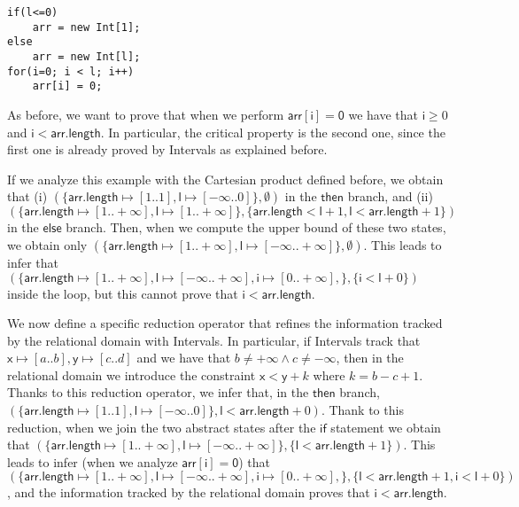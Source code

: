 \documentclass[submission,copyright,creativecommons]{eptcs}
\newcommand{\statement}[1]{\ensuremath{\mathsf{#1}}}
\begin{document}
\begin{lstlisting}
if(l<=0)
	arr = new Int[1];
else 
	arr = new Int[l];
for(i=0; i < l; i++)
	arr[i] = 0;
\end{lstlisting}

As before, we want to prove that when we perform \statement{arr[i]=0} we have that $\statement{i} \geq 0$ and $\statement{i} < \statement{arr.length}$. In particular, the critical property is the second one, since the first one is already proved by Intervals as explained before.

If we analyze this example with the Cartesian product defined before, we obtain that (i) $(\{\statement{arr.length} \mapsto [1..1], \statement{l} \mapsto [-\infty..0]\}, \emptyset)$ in the \statement{then} branch, and (ii) $(\{\statement{arr.length} \mapsto [1..+\infty], \statement{l} \mapsto [1..+\infty]\}, \{\statement{arr.length} < \statement{l}+1, \statement{l} < \statement{arr.length}+1\})$ in the \statement{else} branch. Then, when we compute the upper bound of these two states, we obtain only $(\{\statement{arr.length} \mapsto [1..+\infty], \statement{l} \mapsto [-\infty..+\infty]\}, \emptyset)$. This leads to infer that $(\{\statement{arr.length} \mapsto [1..+\infty], \statement{l} \mapsto [-\infty..+\infty], \statement{i} \mapsto [0..+\infty], \}, \{\statement{i} < \statement{l}+0\})$ inside the loop, but this cannot prove that $\statement{i} < \statement{arr.length}$.

We now define a specific reduction operator that refines the information tracked by the relational domain with Intervals. In particular, if Intervals track that $\statement{x} \mapsto [a..b], \statement{y} \mapsto [c..d]$ and we have that $b \neq +\infty \wedge c \neq -\infty$, then in the relational domain we introduce the constraint $\statement{x} < \statement{y} + k$ where $k=b-c+1$. Thanks to this reduction operator, we infer that, in the \statement{then} branch, $(\{\statement{arr.length} \mapsto [1..1], \statement{l} \mapsto [-\infty..0]\}, \statement{l} < \statement{arr.length} + 0)$. Thank to this reduction, when we join the two abstract states after the \statement{if} statement we obtain that $(\{\statement{arr.length} \mapsto [1..+\infty], \statement{l} \mapsto [-\infty..+\infty]\}, \{\statement{l} < \statement{arr.length} + 1\})$. This leads to infer (when we analyze \statement{arr[i]=0}) that $(\{\statement{arr.length} \mapsto [1..+\infty], \statement{l} \mapsto [-\infty..+\infty], \statement{i} \mapsto [0..+\infty], \}, \{\statement{l} < \statement{arr.length} + 1, \statement{i} < \statement{l}+0\})$, and the information tracked by the relational domain proves that $\statement{i} < \statement{arr.length}$.
\end{document}
